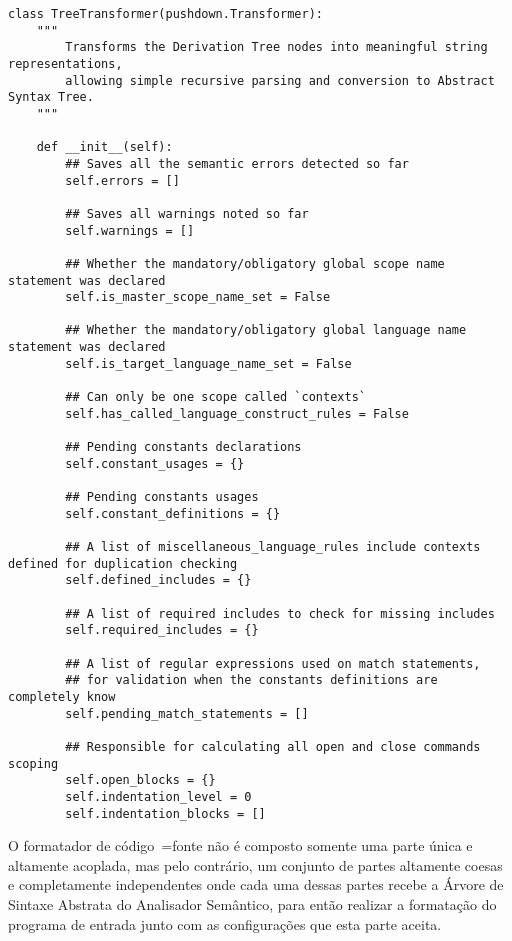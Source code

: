 \begin{lstlisting}[caption={Construtor do Analisador Semântico},label={semanticAnalizerConstructor},style=mypython]
class TreeTransformer(pushdown.Transformer):
    """
        Transforms the Derivation Tree nodes into meaningful string representations,
        allowing simple recursive parsing and conversion to Abstract Syntax Tree.
    """

    def __init__(self):
        ## Saves all the semantic errors detected so far
        self.errors = []

        ## Saves all warnings noted so far
        self.warnings = []

        ## Whether the mandatory/obligatory global scope name statement was declared
        self.is_master_scope_name_set = False

        ## Whether the mandatory/obligatory global language name statement was declared
        self.is_target_language_name_set = False

        ## Can only be one scope called `contexts`
        self.has_called_language_construct_rules = False

        ## Pending constants declarations
        self.constant_usages = {}

        ## Pending constants usages
        self.constant_definitions = {}

        ## A list of miscellaneous_language_rules include contexts defined for duplication checking
        self.defined_includes = {}

        ## A list of required includes to check for missing includes
        self.required_includes = {}

        ## A list of regular expressions used on match statements,
        ## for validation when the constants definitions are completely know
        self.pending_match_statements = []

        ## Responsible for calculating all open and close commands scoping
        self.open_blocks = {}
        self.indentation_level = 0
        self.indentation_blocks = []
\end{lstlisting}

O formatador de código~=fonte não é composto somente uma parte única e
altamente acoplada, mas pelo contrário,
um conjunto de partes altamente coesas e
completamente independentes onde cada uma dessas partes recebe a Árvore de Sintaxe Abstrata do Analisador Semântico,
para então realizar a formatação do programa de entrada junto com as configurações que esta parte aceita.

